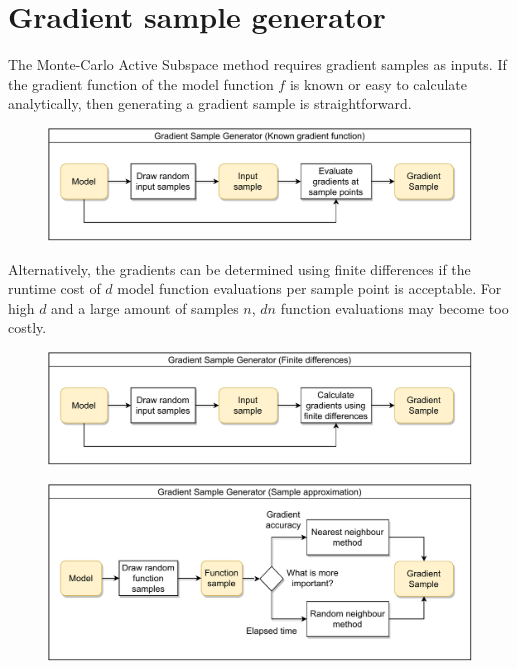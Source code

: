 \documentclass[
  a4paper,  %
  twoside,  %
  bibliography=totoc,
  headsepline,
  cleardoublepage=empty,
  parskip=half,
  draft=false
]{scrbook}
\begin{document}
\section {Gradient sample generator}

The Monte-Carlo Active Subspace method requires gradient samples as inputs.
If the gradient function of the model function $f$ is known or easy to calculate analytically, then generating a gradient sample is straightforward.

\begin{figure}[H]
\begin{center}
	\includegraphics[width=\textwidth]{graphics/GradientGen_KGF.pdf}
\end{center}
\end{figure}

Alternatively, the gradients can be determined using finite differences if the runtime cost of $d$ model function evaluations per sample point is acceptable.
For high $d$ and a large amount of samples $n$, $dn$ function evaluations may become too costly.

\begin{figure}[H]
\begin{center}
	\includegraphics[width=\textwidth]{graphics/GradientGen_FD.pdf}
\end{center}
\end{figure}

\begin{figure}[H]
\begin{center}
	\includegraphics[width=\textwidth]{graphics/GradientGen_SA.pdf}
\end{center}
\end{figure}
\end{document}
